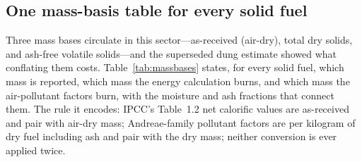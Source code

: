 \subsection{One mass-basis table for every solid fuel}
\label{sec:massbases}

Three mass bases circulate in this sector---as-received (air-dry), total dry solids, and
ash-free volatile solids---and the superseded dung estimate showed what conflating them
costs. Table~\ref{tab:massbases} states, for every solid fuel, which mass is reported,
which mass the energy calculation burns, and which mass the air-pollutant factors burn,
with the moisture and ash fractions that connect them. The rule it encodes: IPCC's
Table~1.2 net calorific values are as-received and pair with air-dry mass; Andreae-family
pollutant factors are per kilogram of dry fuel including ash and pair with the dry mass;
neither conversion is ever applied twice.

